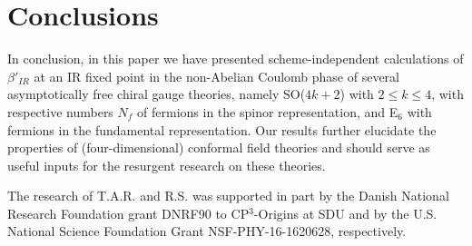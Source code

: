\documentclass[prd,twocolumn,nofootinbib,amsfonts,amssymb]{revtex4}
\begin{document}

\section{Conclusions}
\label{conclusions_section}

In conclusion, in this paper we have presented scheme-independent 
calculations of $\beta'_{IR}$ at an IR fixed point in the non-Abelian Coulomb
phase of several asymptotically 
free chiral gauge theories, namely SO($4k+2$) with $2 \le k \le 4$, with 
respective numbers $N_f$ of fermions in the spinor representation, and E$_6$ 
with fermions in the fundamental representation.  Our results further elucidate
the properties of (four-dimensional) conformal field theories and should serve
as useful inputs for the resurgent research on these theories. 


\begin{acknowledgments}

The research of T.A.R. and R.S. was supported in part by the Danish National
Research Foundation grant DNRF90 to CP$^3$-Origins at SDU and by the
U.S. National Science Foundation Grant NSF-PHY-16-1620628, respectively.  

\end{acknowledgments}

\end{document}
